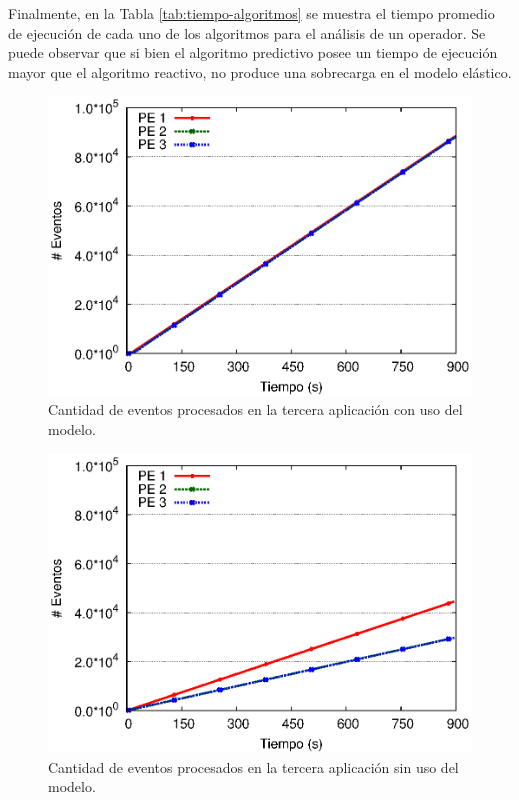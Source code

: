 
Finalmente, en la Tabla \ref{tab:tiempo-algoritmos} se muestra el tiempo promedio de ejecución de cada uno de los algoritmos para el análisis de un operador. Se puede observar que si bien el algoritmo predictivo posee un tiempo de ejecución mayor que el algoritmo reactivo, no produce una sobrecarga en el modelo elástico.

\newpage

\begin{figure}[!ht]
\centering
    \includegraphics[scale=0.75]{images/exp/app3/cm/logical/eventCount.eps}
    \caption{Cantidad de eventos procesados en la tercera aplicación con uso del modelo.}
    \label{fig:app3-eventCount-cm}
\end{figure}

\begin{figure}[!ht]
\centering
    \includegraphics[scale=0.75]{images/exp/app3/sm/logical/eventCount.eps}
    \caption{Cantidad de eventos procesados en la tercera aplicación sin uso del modelo.}
    \label{fig:app3-eventCount-sm}
\end{figure}

